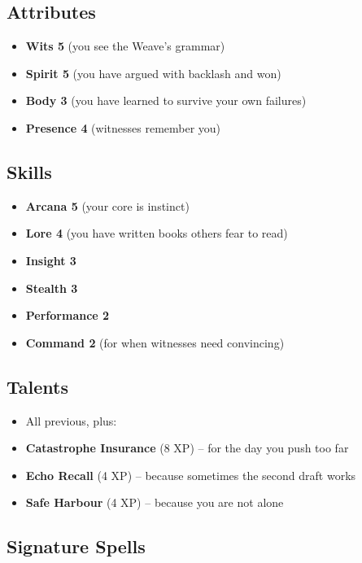 \subsection{Attributes}

\begin{itemize}
    \item \textbf{Wits 5} (you see the Weave's grammar)
    \item \textbf{Spirit 5} (you have argued with backlash and won)
    \item \textbf{Body 3} (you have learned to survive your own failures)
    \item \textbf{Presence 4} (witnesses remember you)
\end{itemize}

\subsection{Skills}

\begin{itemize}
    \item \textbf{Arcana 5} (your core is instinct)
    \item \textbf{Lore 4} (you have written books others fear to read)
    \item \textbf{Insight 3}
    \item \textbf{Stealth 3}
    \item \textbf{Performance 2}
    \item \textbf{Command 2} (for when witnesses need convincing)
\end{itemize}

\subsection{Talents}

\begin{itemize}
    \item All previous, plus:
    \item \textbf{Catastrophe Insurance} (8 XP) -- for the day you push too far
    \item \textbf{Echo Recall} (4 XP) -- because sometimes the second draft works
    \item \textbf{Safe Harbour} (4 XP) -- because you are not alone
\end{itemize}

\subsection{Signature Spells}

